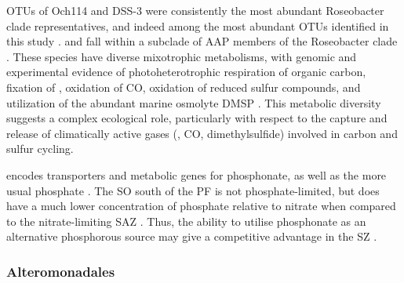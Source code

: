 \acp{OTU} of  Och114 and  DSS-3 were consistently the most abundant Roseobacter clade representatives, and indeed among the most abundant \acp{OTU} identified in this study .
 and  fall within a subclade of \ac{AAP} members of the Roseobacter clade \cite{Swingley:2007dm}.
These species have diverse mixotrophic metabolisms, with genomic and experimental evidence of photoheterotrophic respiration of organic carbon, fixation of , oxidation of CO, oxidation of reduced sulfur compounds, and utilization of the abundant marine osmolyte \ac{DMSP} \cite{King:2003kc,Moran:2004ie,WagnerDobler:2006kb,Swingley:2007dm,Brinkhoff:2008do,Howard:2008hf}.
This metabolic diversity suggests a complex ecological role, particularly with respect to the capture and release of climatically active gases (, CO, dimethylsulfide) involved in carbon and sulfur cycling.

 encodes transporters and metabolic genes for phosphonate, as well as the more usual phosphate \cite{Swingley:2007dm}.
The \ac{SO} south of the \ac{PF} is not phosphate-limited, but does have a much lower concentration of phosphate relative to nitrate when compared to the nitrate-limiting \ac{SAZ} \cite{Weber:2010fi}.
Thus, the ability to utilise phosphonate as an alternative phosphorous source may give  a competitive advantage in the \ac{SZ} \cite{Huang:2005ve}.

\subsubsection{Alteromonadales}

